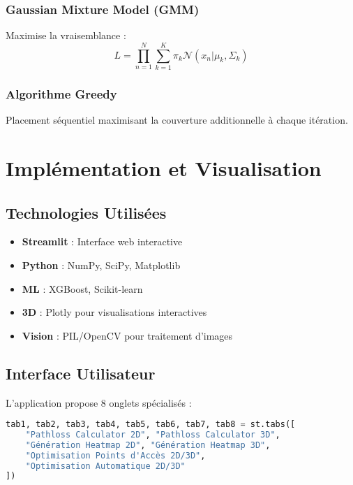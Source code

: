 \documentclass[12pt,a4paper]{article}
\begin{document}
\subsubsection{Gaussian Mixture Model (GMM)}
Maximise la vraisemblance :
\begin{equation}
L = \prod_{n=1}^{N} \sum_{k=1}^{K} \pi_k \mathcal{N}(x_n|\mu_k, \Sigma_k)
\end{equation}

\subsubsection{Algorithme Greedy}
Placement séquentiel maximisant la couverture additionnelle à chaque itération.

\section{Implémentation et Visualisation}

\subsection{Technologies Utilisées}

\begin{itemize}
    \item \textbf{Streamlit} : Interface web interactive
    \item \textbf{Python} : NumPy, SciPy, Matplotlib
    \item \textbf{ML} : XGBoost, Scikit-learn
    \item \textbf{3D} : Plotly pour visualisations interactives
    \item \textbf{Vision} : PIL/OpenCV pour traitement d'images
\end{itemize}

\subsection{Interface Utilisateur}

L'application propose 8 onglets spécialisés :

\begin{lstlisting}[language=Python, caption=Structure de l'interface]
tab1, tab2, tab3, tab4, tab5, tab6, tab7, tab8 = st.tabs([
    "Pathloss Calculator 2D", "Pathloss Calculator 3D", 
    "Génération Heatmap 2D", "Génération Heatmap 3D", 
    "Optimisation Points d'Accès 2D/3D",
    "Optimisation Automatique 2D/3D"
])
\end{lstlisting}
\end{document}

